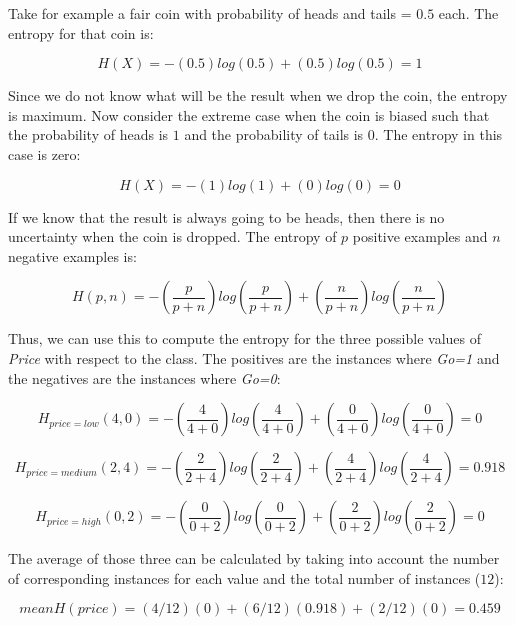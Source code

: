 \documentclass[
  11pt,
]{krantz}
\begin{document}
Take for example a fair coin with probability of heads and tails = \(0.5\) each. The entropy for that coin is:

\begin{equation*}
  H(X) = - (0.5)log(0.5) + (0.5)log(0.5) = 1
\end{equation*}

Since we do not know what will be the result when we drop the coin, the entropy is maximum. Now consider the extreme case when the coin is biased such that the probability of heads is \(1\) and the probability of tails is \(0\). The entropy in this case is zero:

\begin{equation*}
  H(X) = - (1)log(1) + (0)log(0) = 0
\end{equation*}

If we know that the result is always going to be heads, then there is no uncertainty when the coin is dropped. The entropy of \(p\) positive examples and \(n\) negative examples is:

\begin{equation}
  H(p, n) = - (\frac{p}{p+n})log(\frac{p}{p+n}) + (\frac{n}{p+n})log(\frac{n}{p+n})
  \label{eq:binaryentropy}
\end{equation}

Thus, we can use this to compute the entropy for the three possible values of \emph{Price} with respect to the class. The positives are the instances where \emph{Go=1} and the negatives are the instances where \emph{Go=0}:

\begin{equation*}
  H_{price=low}(4, 0) = - (\frac{4}{4+0})log(\frac{4}{4+0}) + (\frac{0}{4+0})log(\frac{0}{4+0}) = 0
\end{equation*}

\begin{equation*}
  H_{price=medium}(2, 4) = - (\frac{2}{2+4})log(\frac{2}{2+4}) + (\frac{4}{2+4})log(\frac{4}{2+4}) = 0.918
\end{equation*}

\begin{equation*}
  H_{price=high}(0, 2) = - (\frac{0}{0+2})log(\frac{0}{0+2}) + (\frac{2}{0+2})log(\frac{2}{0+2}) = 0
\end{equation*}

The average of those three can be calculated by taking into account the number of corresponding instances for each value and the total number of instances (\(12\)):

\begin{equation*}
  meanH(price) = (4/12)(0) + (6/12)(0.918) + (2/12)(0) = 0.459
\end{equation*}
\end{document}
